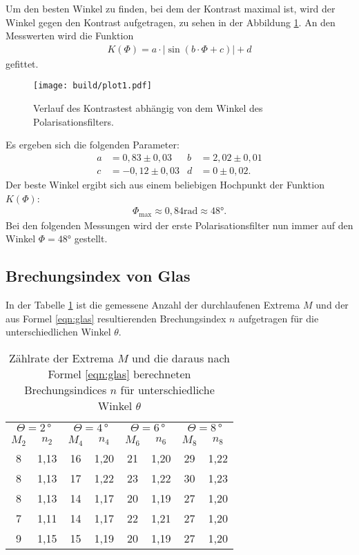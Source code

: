 Um den besten Winkel zu finden, bei dem der Kontrast maximal ist, wird
der Winkel gegen den Kontrast aufgetragen, zu sehen in der Abbildung \ref{fig:kontrast}.
An den Messwerten wird die Funktion
\begin{align}
  K\left(\Phi\right) = a \cdot \left| \sin\left(b\cdot\Phi+c \right)\right| + d
\end{align}
gefittet.

\begin{figure}
    \centering
    \texttt{[image: build/plot1.pdf]}
    \caption{Verlauf des Kontrastest abhängig von dem Winkel des Polarisationsfilters.}
    \label{fig:kontrast}
\end{figure}

Es ergeben sich die folgenden Parameter:
\begin{align*}
  a&=0,83\pm0,03
  &b&=2,02\pm0,01\\
  c&=-0,12\pm0,03
  &d&=0\pm0,02.
\end{align*}
Der beste Winkel ergibt sich aus einem beliebigen
Hochpunkt der Funktion $K(\Phi)$:
\begin{align*}
 \Phi_\mathrm{max}\approx0,84\si{\radian}\approx48\si{\degree}.
\end{align*}
Bei den folgenden Messungen wird der erste Polarisationsfilter
nun immer auf den Winkel $\Phi=48\si{\degree}$ gestellt.


\subsection{Brechungsindex von Glas}
In der Tabelle \ref{tab:glas} ist die gemessene Anzahl der durchlaufenen Extrema $M$
und der aus Formel \eqref{eqn:glas} resultierenden Brechungsindex $n$ aufgetragen
für die unterschiedlichen Winkel $\theta$.

\begin{table}
  \centering
  \caption{Zählrate der Extrema $M$ und die daraus nach Formel \eqref{eqn:glas} berechneten Brechungsindices $n$ für unterschiedliche Winkel $\theta$}
  \label{tab:glas}
  \begin{tabular}{c c | c c | c c | c c}
    \toprule
\multicolumn{2}{c}{$\Theta=2\,\si{\degree}$}  &  \multicolumn{2}{c}{$\Theta=4\,\si{\degree}$} & \multicolumn{2}{c}{$\Theta=6\,\si{\degree}$} & \multicolumn{2}{c}{$\Theta=8\,\si{\degree}$}\\
      $M_2$ &  $n_2$ &  $M_4$ & $n_4$ & $M_6$ &  $n_6$ & $M_8$ & $n_8$ \\
  \midrule
       8 &  1,13 &  16 &  1,20 & 21 & 1,20 & 29 & 1,22\\
       8 &  1,13 &  17 &  1,22 & 23 & 1,22 & 30 & 1,23\\
       8 &  1,13 &  14 &  1,17 & 20 & 1,19 & 27 & 1,20\\
       7 &  1,11 &  14 &  1,17 & 22 & 1,21 & 27 & 1,20\\
       9 &  1,15 &  15 &  1,19 & 20 & 1,19 & 27 & 1,20\\
  \bottomrule
  \end{tabular}
\end{table}

